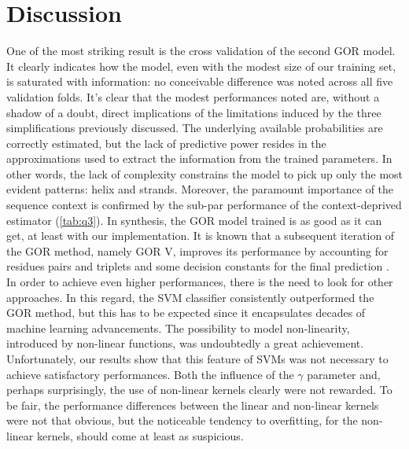 \documentclass[nocrop]{bioinfo}
\begin{document}
\section{Discussion}
One of the most striking result is the cross validation of the second GOR model.
It clearly indicates how the model, even with the modest size of our training set, is saturated with information: no conceivable difference was noted across all five validation folds.
It's clear that the modest performances noted are, without a shadow of a doubt, direct implications of the  limitations induced by the three simplifications previously discussed.
The underlying available probabilities are correctly estimated, but the lack of predictive power resides in the approximations used to extract the information from the trained parameters.
In other words, the lack of complexity constrains the model to pick up only the most evident patterns: helix and strands.
Moreover, the paramount importance of the sequence context is confirmed by the sub-par performance of the context-deprived estimator (\autoref{tab:q3}).
In synthesis, the GOR model trained is as good as it can get, at least with our implementation.
It is known that a subsequent iteration of the GOR method, namely GOR V, improves its performance by accounting for residues pairs and triplets and some decision constants for the final prediction \citep{sen2005gor}.
In order to achieve even higher performances, there is the need to look for other approaches.
In this regard, the SVM classifier consistently outperformed the GOR method, but this has to be expected since it encapsulates decades of machine learning advancements.
The possibility to model non-linearity, introduced by non-linear functions, was undoubtedly a great achievement.
Unfortunately, our results show that this feature of SVMs was not necessary to achieve satisfactory performances.
Both the influence of the $\gamma$ parameter and, perhaps surprisingly, the use of non-linear kernels clearly were not rewarded.
To be fair, the performance differences between the linear and non-linear kernels were not that obvious, but the noticeable tendency to overfitting, for the non-linear kernels, should come at least as suspicious.
\end{document}
